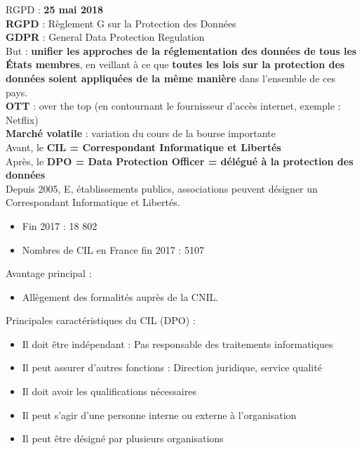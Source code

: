 \documentclass[a4paper,11pt]{report}
\begin{document}
RGPD : \textbf{25 mai 2018} \\
\textbf{RGPD} : Règlement G sur la Protection des Données \\
\textbf{GDPR} : General Data Protection Regulation\\
But : \textbf{unifier les approches de la réglementation des données de tous les États membres}, en veillant à ce que \textbf{toutes les lois sur la protection des données soient appliquées de la même manière} dans l’ensemble de ces pays.\\

\textbf{OTT} : over the top (en contournant le fournisseur d’accès internet, exemple : Netflix) \\
\textbf{Marché volatile} : variation du cours de la bourse importante\\

Avant, le \textbf{CIL = Correspondant Informatique et Libertés} \\
Après, le \textbf{DPO = Data Protection Officer = délégué à la protection des données}\\

Depuis 2005, E, établissements publics, associations peuvent désigner un Correspondant Informatique et Libertés. \\
\begin{itemize}
    \item Fin 2017 : 18 802
    \item Nombres de CIL en France fin 2017 : 5107
\end{itemize}

Avantage principal :
\begin{itemize}
    \item Allègement des formalités auprès de la CNIL.
\end{itemize}

Principales caractéristiques du CIL (DPO) :
\begin{itemize}
    \item Il doit être indépendant : Pas responsable des traitements informatiques\\
    \item Il peut assurer d’autres fonctions : Direction juridique, service qualité\\
    \item Il doit avoir les qualifications nécessaires\\
    \item Il peut s’agir d’une personne interne ou externe à l’organisation\\
    \item Il peut être désigné par plusieurs organisations \\
\end{itemize}
\end{document}
